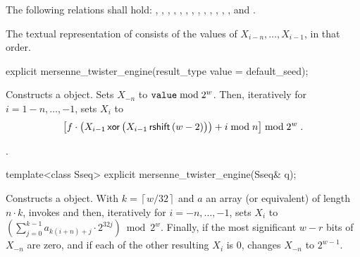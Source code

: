 \pnum
The following relations shall hold:
  ,
  ,
  ,
  ,
  ,
  ,
  ,
  ,
  ,
  ,
  ,
  ,
  ,
and
  .

\pnum
The textual representation%
of 
consists of
the values of
 $X_{i-n}, \ldots, X_{i-1}$,
in that order.

%

\begin{itemdecl}
explicit mersenne_twister_engine(result_type value = default_seed);
\end{itemdecl}

\begin{itemdescr}
\pnum\effects Constructs a  object.
Sets $X_{-n}$ to $\texttt{value} \bmod 2^w$.
 Then, iteratively for $i = 1\!-\!n,\ldots,-1$,
 sets $X_i$
 to
\[%
 \bigl[f \cdot
       \bigl(X_{i-1} \xor \bigl(X_{i-1} \rightshift (w-2)\bigr)
       \bigr)
       + i \bmod n
 \bigr] \bmod 2^w
\; \mbox{.}
\]%

\pnum\complexity {}.
\end{itemdescr}

%

\begin{itemdecl}
template<class Sseq> explicit mersenne_twister_engine(Sseq& q);
\end{itemdecl}

\begin{itemdescr}
\pnum\effects Constructs a  object.
 With
 $ k = \left\lceil w / 32 \right\rceil $
 and $a$ an array (or equivalent)
 of length $ n \cdot k $,
 invokes 
 and then, iteratively for $i = -n,\ldots,-1$,
 sets $X_i$
 to $ \left(\sum_{j=0}^{k-1}a_{k(i+n)+j} \cdot 2^{32j} \right) \bmod 2^w $.
 Finally,
 if the most significant $w-r$ bits of $X_{-n}$
 are zero,
 and if each of the other resulting $X_i$ is $0$,
 changes $X_{-n}$
 to $ 2^{w-1} $.
\end{itemdescr}


